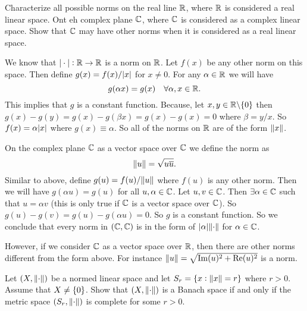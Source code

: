 \begin{problem}
	Characterize all possible norms on the real line $ \mathbb{R} $, where $ \mathbb{R} $ is considered a real linear space. Ont eh complex plane $ \mathbb{C}$, where $ \mathbb{C}  $ is considered as a complex linear space. Show that $ \mathbb{C} $ may have other norms when it is considered as a real linear space. 
\end{problem}
\begin{solution}
	We know that $ |\cdot|:\mathbb{R}\to\mathbb{R} $ is a norm on $ \mathbb{R} $. Let $ f(x) $ be any other norm on this space. Then define $ g(x) = f(x)/|x| $ for $ x\neq0 $. For any $ \alpha\in\mathbb{R}  $ we will have
	\[ g(\alpha x) = g(x) \quad \forall \alpha,x\in\mathbb{R} . \]
	This implies that $ g $ is a constant function. Because, let $ x,y\in \mathbb{R}\backslash\{0\} $ then $ g(x) - g(y) = g(x) - g(\beta x) = g(x) - g(x) = 0  $ where $ \beta = y/x $. So $ f(x) = \alpha |x| $ where $ g(x) \equiv \alpha $. So all of the norms on $ \mathbb{R} $ are of the form $ \norm{x} $.
	
	On the complex plane $ \mathbb{C} $ as a vector space over $ \mathbb{C} $ we define the norm as
	\[ \norm{u} = \sqrt{u\overline{u}}. \]
	Similar to above, define $ g(u) = f(u)/\norm{u} $ where $ f(u) $ is any other norm. Then we will have $ g(\alpha u) = g(u) $ for all $ u,\alpha \in \mathbb{C} $. Let $ u,v\in \mathbb{C} $. Then $ \exists \alpha\in \mathbb{C} $ such that $ u=\alpha v $ (this is only true if $ \mathbb{C} $ is a vector space over $ \mathbb{C} $). So $ g(u) - g(v) = g(u) - g(\alpha u) = 0 $. So $ g $ is a constant function. So we conclude that every norm in $ (\mathbb{C},\mathbb{C}) $ is in the form of $ |\alpha| \norm{\cdot} $ for $ \alpha\in \mathbb{C} $.
	
	However, if we consider $ \mathbb{C} $ as a vector space over $ \mathbb{R} $, then there are other norms different from the form above. For instance $ \norm{u} = \sqrt{\operatorname{Im}(u)^2 + \operatorname{Re}(u)^2} $ is a norm.
\end{solution}


\begin{problem}
	Let $ (X,\norm{\cdot}) $ be a normed linear space and let $ S_r = \{x:\norm{x}=r\} $ where $ r>0 $. Assume that $ X\neq \{0\} $. Show that $ (X,\norm{\cdot}) $ is a Banach space if and only if the metric space $ (S_r,\norm{\cdot}) $ is complete for some $ r>0 $.
\end{problem}

